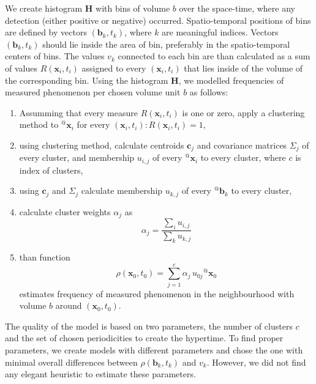 We create histogram $\mathbf{H}$ with bins of volume $b$ over the space-time, where any detection (either positive or negative) occurred.
Spatio-temporal positions of bins are defined by vectors $\left(\mathbf{b}_{k}, t_{k}\right)$, where $k$ are meaningful indices.
Vectors $\left(\mathbf{b}_{k}, t_{k}\right)$ should lie inside the area of bin, preferably in the spatio-temporal centers of bins.
The values $v_{k}$ connected to each bin are than calculated as a sum of values $R\left(\mathbf{x}_i, t_i\right)$ assigned to every $\left(\mathbf{x}_i, t_i\right)$ that lies inside of the volume of the corresponding bin.
Using the histogram $\mathbf{H}$, we modelled frequencies of measured phenomenon per chosen volume unit $b$ as follows:
\begin{enumerate}
    \item Assumming that every measure $R\left(\mathbf{x}_i, t_i\right)$ is one or zero,  apply a clustering method to ${}^{@}\mathbf{x}_{i}$ for every $\left(\mathbf{x}_i, t_i\right) : R\left(\mathbf{x}_i, t_i\right) = 1 $,
    \item using clustering method, calculate centroids $\mathbf{c}_j$ and covariance matrices $\Sigma_{j}$ of every cluster, and membership $u_{i, j}$ of every ${}^{@}\mathbf{x}_{i}$ to every cluster, where $c$ is index of clusters,
    \item using $\mathbf{c}_j$ and $\Sigma_{j}$ calculate membership $u_{k, j}$ of every ${}^{@}\mathbf{b}_{k}$ to every cluster,
    \item calculate cluster weights $\alpha_{j}$ as
\begin{equation}
    \alpha_{j} = \frac{\sum_{i}u_{i, j}}{\sum_{k}u_{k, j}}
\end{equation}\label{eqn:cluster_weights}
    \item than function
\begin{equation}\label{eqn:distribution}
    \rho\left(\mathbf{x}_{0},t_{0}\right) = \sum_{j=1}^{c}{\alpha_j\,u_{0j}{}^{@}\mathbf{x}_{0}}
\end{equation}
estimates frequency of measured phenomenon in the neighbourhood with volume $b$ around $\left(\mathbf{x}_0, t_0\right)$.
\end{enumerate}
%


The quality of the model is based on two parameters, the number of clusters $c$ and the set of chosen periodicities to create the hypertime.
To find proper parameters, we create models with different parameters and chose the one with minimal overall differences between $\rho\left(\mathbf{b}_{k},t_{k}\right)$ and $v_{k}$.
However, we did not find any elegant heuristic to estimate these parameters.


